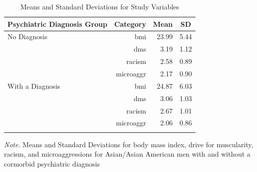 \documentclass[
  english,
  man, fleqn, noextraspace,floatsintext]{apa6}
\begin{document}
\begin{table}[tbp]

\begin{center}
\begin{threeparttable}

\caption{\label{tab:table1}Means and Standard Deviations for Study Variables}

\begin{tabular}{lrrr}
\toprule
Psychiatric Diagnosis Group & \multicolumn{1}{c}{Category} & \multicolumn{1}{c}{Mean} & \multicolumn{1}{c}{SD}\\
\midrule
No Diagnosis & bmi & 23.99 & 5.44\\
 & dms & 3.19 & 1.12\\
 & racism & 2.58 & 0.89\\
 & microaggr & 2.17 & 0.90\\
With a Diagnosis & bmi & 24.87 & 6.03\\
 & dms & 3.06 & 1.03\\
 & racism & 2.67 & 1.01\\
 & microaggr & 2.06 & 0.86\\
\bottomrule
\addlinespace
\end{tabular}

\begin{tablenotes}[para]
\normalsize{\textit{Note.}  Means and Standard Deviations for body mass index, drive for muscularity, racism, and microaggressions for Asian/Asian American men with and without a cormorbid psychiatric diagnosis}
\end{tablenotes}

\end{threeparttable}
\end{center}

\end{table}
\end{document}
